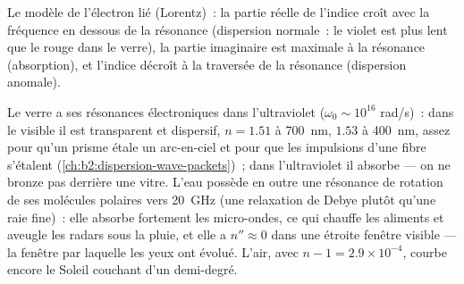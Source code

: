 \begin{omfigure}

{\small Le modèle de l'électron lié (Lorentz)~: la partie réelle de l'indice
croît avec la fréquence en dessous de la résonance (dispersion normale~: le violet
est plus lent que le rouge dans le verre), la partie imaginaire est maximale à la
résonance (absorption), et l'indice décroît à la traversée de la résonance
(dispersion anomale).}
\end{omfigure}

\begin{example}\label{ex:b2:waves-in-media:dielectrics}
Le verre a ses résonances électroniques dans l'ultraviolet ($\omega_0 \sim 10^{16}$
rad/s)~: dans le visible il est transparent et dispersif, $n = 1.51$ à
\qty{700}{nm}, $1.53$ à \qty{400}{nm}, assez pour qu'un prisme étale un
arc-en-ciel et pour que les impulsions d'une fibre s'étalent (\cref{ch:b2:dispersion-wave-packets})~;
dans l'ultraviolet il absorbe --- on ne bronze pas derrière une vitre.
L'eau possède en outre une résonance de rotation de ses molécules polaires vers
\qty{20}{GHz} (une relaxation de Debye plutôt qu'une raie fine)~: elle absorbe fortement
les micro-ondes, ce qui chauffe les aliments et aveugle les radars sous la pluie,
et elle a $n'' \approx 0$ dans une étroite fenêtre visible --- la fenêtre par
laquelle les yeux ont évolué. L'air, avec $n - 1 = 2.9 \times 10^{-4}$, courbe encore le
Soleil couchant d'un demi-degré.
\end{example}

